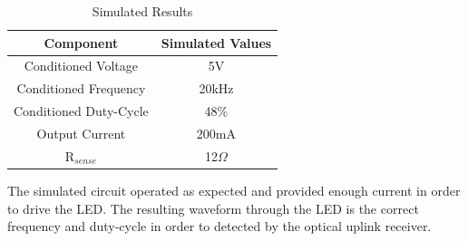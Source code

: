 \begin{table}[H]
	\centering
\caption{Simulated Results}
\label{tab:simresults}
\begin{tabular}{|c|c|}
	\hline 
	Component & Simulated Values \\ 
	\hline 
	Conditioned Voltage & 5V \\ 
	\hline 
	Conditioned Frequency & 20kHz \\ 
	\hline 
	Conditioned Duty-Cycle & 48\% \\ 
	\hline 
	Output Current & 200mA \\ 
	\hline 
	R$_{sense}$ & 12$\Omega$ \\ 
	\hline 
\end{tabular} 
\end{table}

The simulated circuit operated as expected and provided enough current in order to drive the LED. The resulting waveform through the LED is the correct frequency and duty-cycle in order to detected by the optical uplink receiver.
	






